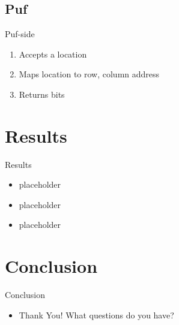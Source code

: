 \documentclass[presentation]{beamer}
\begin{document}
\subsection{Puf}
\begin{frame}{Puf-side}
  \begin{enumerate}
    \item Accepts a location
      \pause
    \item Maps location to row, column address
      \pause
    \item Returns bits
  \end{enumerate}
\end{frame}
\section{Results}
\begin{frame}{Results}
  \begin{itemize}
      \item placeholder
      \item placeholder
      \item placeholder
  \end{itemize}
\end{frame}
\section{Conclusion}
\begin{frame}{Conclusion}
  \begin{itemize}
      \item Thank You! What questions do you have?
      \end{itemize}
\end{frame}
\end{document}
